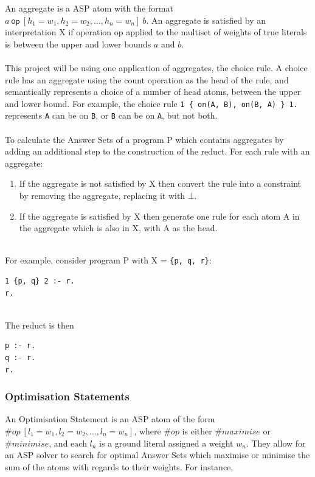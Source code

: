 An aggregate \cite{Eiter2008} is a ASP atom with the format $a \: \textsf{op} \: [h_1=w_1, h_2=w_2, \dots, h_n=w_n 	] \: b$. An aggregate is satisfied by an interpretation X if operation op applied to the multiset of weights of true literals is between the upper and lower bounds $a$ and $b$. \\ \\
This project will be using one application of aggregates, the choice rule. A choice rule has an aggregate using the count operation as the head of the rule, and semantically represents a choice of a number of head atoms, between the upper and lower bound. For example, the choice rule \lstinline!1 { on(A, B), on(B, A) } 1.! represents \lstinline!A! can be on \lstinline!B!, or \lstinline!B! can be on \lstinline!A!, but not both. \\ \\
To calculate the Answer Sets of a program P which contains aggregates by adding an additional step to the construction of the reduct. For each rule with an aggregate:

\begin{enumerate}
\item If the aggregate is not satisfied by X then convert the rule into a constraint by removing the aggregate, replacing it with $\bot$.
\item If the aggregate is satisfied by X then generate one rule for each atom A in the aggregate which is also in X, with A as the head.
\end{enumerate}
\mbox{}\\
For example, consider program P with X = \lstinline!{p, q, r}!:\\

\begin{lstlisting}
1 {p, q} 2 :- r.
r.
\end{lstlisting}
\mbox{}\\
The reduct is then \\

\begin{lstlisting}
p :- r.
q :- r.
r.
\end{lstlisting}

\subsubsection{Optimisation Statements}

An Optimisation Statement \cite{Eiter2008} is an ASP atom of the form $ \#op \: [l_1 = w_1, l_2 = w_2, \dots, l_n = w_n]$, where $\#op$ is either $\#maximise$ or $\#minimise$, and each $l_n$ is a ground literal assigned a weight $w_n$. They allow for an ASP solver to search for optimal Answer Sets which maximise or minimise the sum of the atoms with regards to their weights. For instance, \\

